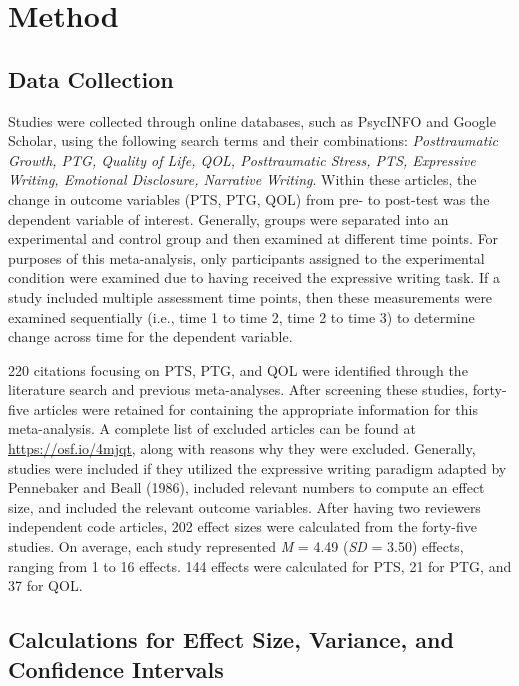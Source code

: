 \documentclass[english,man, mask]{apa6}
\theoremstyle{definition}
\theoremstyle{definition}
\theoremstyle{definition}
\theoremstyle{remark}
\begin{document}
\section{Method}\label{method}

\subsection{Data Collection}\label{data-collection}

Studies were collected through online databases, such as PsycINFO and
Google Scholar, using the following search terms and their combinations:
\emph{Posttraumatic Growth, PTG, Quality of Life, QOL, Posttraumatic
Stress, PTS, Expressive Writing, Emotional Disclosure, Narrative
Writing}. Within these articles, the change in outcome variables (PTS,
PTG, QOL) from pre- to post-test was the dependent variable of interest.
Generally, groups were separated into an experimental and control group
and then examined at different time points. For purposes of this
meta-analysis, only participants assigned to the experimental condition
were examined due to having received the expressive writing task. If a
study included multiple assessment time points, then these measurements
were examined sequentially (i.e., time 1 to time 2, time 2 to time 3) to
determine change across time for the dependent variable.

220 citations focusing on PTS, PTG, and QOL were identified through the
literature search and previous meta-analyses. After screening these
studies, forty-five articles were retained for containing the
appropriate information for this meta-analysis. A complete list of
excluded articles can be found at \url{https://osf.io/4mjqt}, along with
reasons why they were excluded. Generally, studies were included if they
utilized the expressive writing paradigm adapted by Pennebaker and Beall
(1986), included relevant numbers to compute an effect size, and
included the relevant outcome variables. After having two reviewers
independent code articles, 202 effect sizes were calculated from the
forty-five studies. On average, each study represented \emph{M} = 4.49
(\emph{SD} = 3.50) effects, ranging from 1 to 16 effects. 144 effects
were calculated for PTS, 21 for PTG, and 37 for QOL.

\subsection{Calculations for Effect Size, Variance, and Confidence
Intervals}\label{calculations-for-effect-size-variance-and-confidence-intervals}
\end{document}

